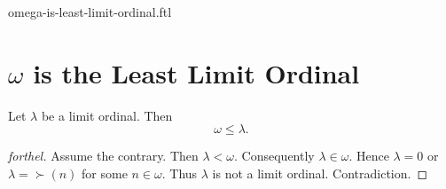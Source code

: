 \documentclass{naproche-library}
\begin{document}
\begin{smodule}{omega-is-least-limit-ordinal.ftl}

  \section*{$\omega$ is the Least Limit Ordinal}

  \begin{proposition}[forthel,id=SET_THEORY_03_5517271459954688]
    Let $\lambda$ be a limit ordinal.
    Then \[ \omega \leq \lambda. \]
  \end{proposition}
  \begin{proof}[forthel]
    Assume the contrary.
    Then $\lambda < \omega$.
    Consequently $\lambda \in \omega$.
    Hence $\lambda = 0$ or $\lambda = \succ(n)$ for some $n \in \omega$.
    Thus $\lambda$ is not a limit ordinal.
    Contradiction.
  \end{proof}
\end{smodule}
\end{document}
